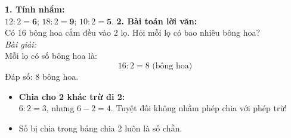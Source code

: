\documentclass[11pt,a4paper]{article}
\begin{document}
\vspace{-1.5mm}
\noindent
\begin{minipage}[t]{0.49\textwidth}\vspace{0pt}
\begin{tcolorbox}[
  enhanced,
  colback=green!4!white,
  colframe=green!60!black,
  arc=2mm, boxrule=0.8pt,
  left=2mm, right=2mm, top=1.8mm, bottom=1.8mm,
  title={\footnotesize\bfseries\color{white}\faCheckCircle\ 4. Ví dụ thực hành chuẩn mực}
]
{\footnotesize
\textbf{1. Tính nhẩm:}\\
$12 : 2 = \mathbf{6}$; $18 : 2 = \mathbf{9}$; $10 : 2 = \mathbf{5}$.
\textbf{2. Bài toán lời văn:}\\
Có $16$ bông hoa cắm đều vào $2$ lọ. Hỏi mỗi lọ có bao nhiêu bông hoa?\\
\textit{Bài giải:}\\
Mỗi lọ có số bông hoa là:
$$16 : 2 = 8\text{ (bông hoa)}$$
Đáp số: $8$ bông hoa.
}
\end{tcolorbox}
\end{minipage}
\hfill
\begin{minipage}[t]{0.49\textwidth}\vspace{0pt}
\begin{tcolorbox}[
  enhanced,
  colback=red!4!white,
  colframe=red!75!black,
  arc=2mm, boxrule=0.8pt,
  left=2mm, right=2mm, top=1.8mm, bottom=1.8mm,
  title={\footnotesize\bfseries\color{white}\faExclamationTriangle\ 5. Mẹo tránh bẫy trắc nghiệm}
]
{\footnotesize
\begin{itemize}\setlength{\itemsep}{1pt}\setlength{\leftskip}{-2.5mm}
  \item \textbf{Chia cho 2 khác trừ đi 2:}\\
  $6 : 2 = 3$, nhưng $6 - 2 = 4$. Tuyệt đối không nhầm phép chia với phép trừ!
  \item Số bị chia trong bảng chia 2 luôn là số chẵn.
\end{itemize}
}
\end{tcolorbox}
\end{minipage}
\end{document}
